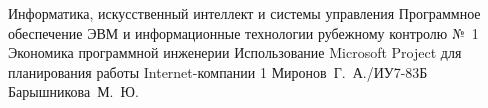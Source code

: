 \documentclass{bmstu}
\begin{document}
\makereporttitle
    {Информатика, искусственный интеллект и системы управления}
    {Программное обеспечение ЭВМ и информационные технологии}
    {рубежному контролю №~1}
    {Экономика программной инженерии}
    {Использование Microsoft Project для планирования работы Internet-компании}
    {1}
    {Миронов~Г.~А./ИУ7-83Б}
    {Барышникова~М.~Ю.}















\end{document}
